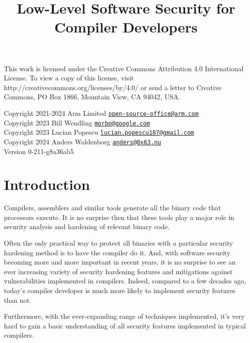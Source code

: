\documentclass[
  a4paper,
]{report}
\title{Low-Level Software Security for Compiler Developers}
\author{}
\date{}
\begin{document}
\maketitle

\clearpage

\vspace*{\fill}
This work is licensed under the Creative Commons Attribution 4.0 International
License. To view a copy of this license, visit
http://creativecommons.org/licenses/by/4.0/ or send a letter to Creative
Commons, PO Box 1866, Mountain View, CA 94042, USA.

  Copyright 2021-2024 Arm Limited
\href{mailto:open-source-office@arm.com}{\nolinkurl{open-source-office@arm.com}}\\
  Copyright 2023 Bill Wendling
\href{mailto:morbo@google.com}{\nolinkurl{morbo@google.com}}\\
  Copyright 2023 Lucian Popescu
\href{mailto:lucian.popescu187@gmail.com}{\nolinkurl{lucian.popescu187@gmail.com}}\\
  Copyright 2024 Anders Waldenborg
\href{mailto:anders@0x63.nu}{\nolinkurl{anders@0x63.nu}}\\

Version 0-211-g8a36ab5
\clearpage

{
\hypersetup{linkcolor=}
\setcounter{tocdepth}{2}
\tableofcontents
}
\chapter{Introduction}\label{introduction}

Compilers, assemblers and similar tools generate all the binary code
that processors execute. It is no surprise then that these tools play a
major role in security analysis and hardening of relevant binary code.

Often the only practical way to protect all binaries with a particular
security hardening method is to have the compiler do it. And, with
software security becoming more and more important in recent years, it
is no surprise to see an ever increasing variety of security hardening
features and mitigations against vulnerabilities implemented in
compilers. Indeed, compared to a few decades ago, today's compiler
developer is much more likely to implement security features than not.

Furthermore, with the ever-expanding range of techniques implemented,
it's very hard to gain a basic understanding of all security features
implemented in typical compilers.
\end{document}
